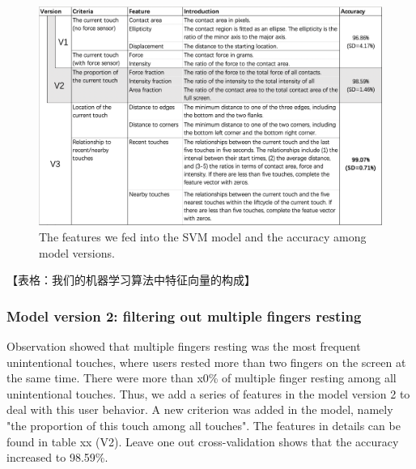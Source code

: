 
\begin{figure}[!tbh]
	\includegraphics[width=1.0\linewidth]{figures/features.png}
	\centering
	\caption{The features we fed into the SVM model and the accuracy among model versions.}
	\label{fig:feature1}
\end{figure}

【表格：我们的机器学习算法中特征向量的构成】

\subsubsection{Model version 2: filtering out multiple fingers resting}

Observation showed that multiple fingers resting was the most frequent unintentional touches, where users rested more than two fingers on the screen at the same time. There were more than x0\% of multiple finger resting among all unintentional touches. Thus, we add a series of features in the model version 2 to deal with this user behavior. A new criterion was added in the model, namely "the proportion of this touch among all touches". The features in details can be found in table xx (V2). Leave one out cross-validation shows that the accuracy increased to 98.59\%.


